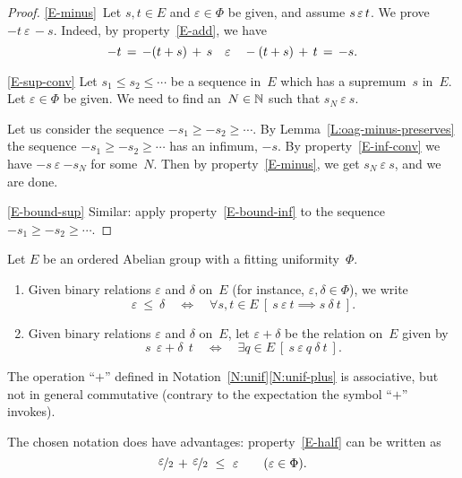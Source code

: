 \documentclass[main.tex]{subfiles}
\begin{document}
\begin{proof}
\noindent\ref{E-minus}\ 
Let $s,t\in E$ and $\varepsilon\in \Phi$ be given,
and assume $s\,\varepsilon\, t$.
We prove $-t\ \varepsilon\,-\!\!s$.
Indeed, by property~\ref{E-add}, we have
\begin{equation*}
-t\,=\,-(t+s)\,+\,s\quad\varepsilon\quad -(t+s)\,+\,t \,=\,-s.
\end{equation*}

\noindent\ref{E-sup-conv}
Let $s_1 \leq s_2 \leq \dotsb$
be a sequence in~$E$
which has a supremum~$s$ in~$E$.
Let $\varepsilon \in \Phi$ be given.
We need to find an~$N\in\mathbb{N}$
such that $s_N \ \varepsilon\ s$.

Let us consider the sequence
$-s_1 \geq -s_2 \geq\dotsb$.
By Lemma~\ref{L:oag-minus-preserves}
the sequence $-s_1 \geq -s_2 \geq \dotsb$
has an infimum, $-s$.
By property~\ref{E-inf-conv}
we have 
$-s\ \varepsilon\ {-s_N}$
for some~$N$.
Then by property~\ref{E-minus},
we get $s_N\ \varepsilon\ s$,
and we are done.

\vspace{.3em}
\noindent\ref{E-bound-sup}
Similar:
apply property~\ref{E-bound-inf}
to the sequence $-s_1 \geq -s_2 \geq \dotsb$.
\end{proof}

%
%
\begin{nt}
\label{N:unif}
Let $E$ be an ordered Abelian group
with a fitting uniformity~$\Phi$.
\begin{enumerate}
\item
\label{N:unif-leq}
Given binary relations $\varepsilon$
and $\delta$ on~$E$
(for instance, $\varepsilon,\delta\in \Phi$),
we write
\begin{equation*}
\varepsilon \ \leq\ \delta
\quad\iff\quad 
\forall s,t\in E\ 
[\ s\ \varepsilon\ t
\implies
s\ \delta\ t\ ].
\end{equation*}

\item
\label{N:unif-plus}
Given binary relations $\varepsilon$ and $\delta$ on~$E$,
let $\varepsilon + \delta$
be the relation on~$E$ given by
\begin{equation*}
s\ \ \varepsilon + \delta\ \ t
\quad\iff\quad
\exists q\in E\ 
[\ s\ \varepsilon\ q\ \delta\ t\ ].
\end{equation*}
\end{enumerate}
\end{nt}
\begin{rem}
The operation ``$+$''
defined in Notation~\ref{N:unif}\ref{N:unif-plus}
is associative,
but not in general commutative
(contrary to the expectation the symbol ``$+$'' invokes).

The chosen notation does have advantages:
property~\ref{E-half} can be written as
\begin{equation*}
\smash{\nicefrac{\textstyle{\varepsilon}}{2}} \,+\,\smash{\nicefrac{\textstyle{\varepsilon}}{2}} \ \leq\ \varepsilon
\qquad(\varepsilon \in \Phi).
\end{equation*}
\end{rem}
\end{document}
